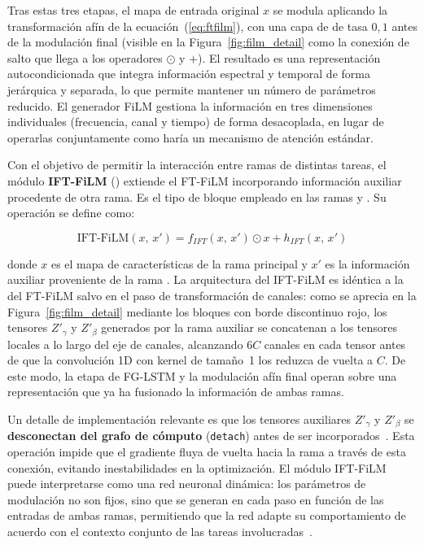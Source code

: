\documentclass[11pt,spanish,listoffigures,listoftables]{tfgetsinf}
\begin{document}
Tras estas tres etapas, el mapa de entrada original $x$ se modula aplicando la 
transformación afín de la ecuación~(\ref{eq:ftfilm}), con una capa de 
 de tasa $0{,}1$ antes de la modulación final 
(visible en la Figura~\ref{fig:film_detail} como la conexión de salto que llega 
a los operadores $\odot$ y $+$). El resultado es una representación 
autocondicionada que integra información espectral y temporal de forma jerárquica 
y separada, lo que permite mantener un número de parámetros reducido. El generador 
FiLM gestiona la información en tres dimensiones individuales (frecuencia, canal 
y tiempo) de forma desacoplada, en lugar de operarlas conjuntamente como haría un 
mecanismo de atención estándar.

Con el objetivo de permitir la interacción entre ramas de distintas tareas, el 
módulo \textbf{IFT-FiLM} () extiende el 
FT-FiLM incorporando información auxiliar procedente de otra rama. Es el tipo de 
bloque empleado en las ramas  y 
. Su operación se define como:

\begin{equation}
  \text{IFT-FiLM}(x,\,x') = f_{IFT}(x,\,x') \odot x + h_{IFT}(x,\,x')
  \label{eq:iftfilm}
\end{equation}

\noindent donde $x$ es el mapa de características de la rama principal y $x'$ es 
la información auxiliar proveniente de la rama . La 
arquitectura del IFT-FiLM es idéntica a la del FT-FiLM salvo en el paso de 
transformación de canales: como se aprecia en la Figura~\ref{fig:film_detail} 
mediante los bloques con borde discontinuo rojo, los tensores $Z'_\gamma$ y 
$Z'_\beta$ generados por la rama auxiliar se concatenan a los tensores locales 
a lo largo del eje de canales, alcanzando $6C$ canales en cada tensor antes de 
que la convolución 1D con kernel de tamaño~1 los reduzca de vuelta a $C$. 
De este modo, la etapa de FG-LSTM y la modulación afín final operan sobre una 
representación que ya ha fusionado la información de ambas ramas.

Un detalle de implementación relevante es que los tensores auxiliares $Z'_\gamma$ y 
$Z'_\beta$ se \textbf{desconectan del grafo de cómputo} (\texttt{detach}) antes de 
ser incorporados~\cite{wang2025mftfilm}. Esta operación impide que el gradiente 
fluya de vuelta hacia la rama  a través de esta conexión, 
evitando inestabilidades en la optimización. El módulo IFT-FiLM puede interpretarse 
como una red neuronal dinámica: los parámetros de modulación no son fijos, sino que 
se generan en cada paso en función de las entradas de ambas ramas, permitiendo que 
la red adapte su comportamiento de acuerdo con el contexto conjunto de las tareas 
involucradas~\cite{wang2025mftfilm}.
\end{document}
